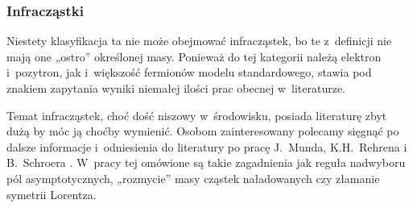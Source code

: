 \documentclass[10pt,t]{beamer}
\begin{document}
\begin{frame}
  \frametitle{Infracząstki}


  Niestety klasyfikacja ta \alert{nie} może obejmować infracząstek, bo
  te z~definicji nie mają one „ostro” określonej masy. Ponieważ do tej
  kategorii należą elektron i~pozytron, jak i~większość fermionów modelu
  standardowego, stawia pod znakiem zapytania wyniki niemałej ilości prac
  obecnej w~literaturze.

  Temat infracząstek, choć dość niszowy w~środowisku, posiada literaturę
  zbyt dużą by móc ją choćby wymienić. Osobom zainteresowany polecamy
  sięgnąć po dalsze informacje i~odniesienia do literatury po pracę
  J.~Munda, K.H.~Rehrena i B.~Schroera
  \parencite{Mund-Rehren-Schroer-Infraparticle-quantum-fiels-ETC-Pub-2022}.
  W~pracy tej omówione są takie zagadnienia jak reguła nadwyboru pól
  asymptotycznych, „rozmycie” masy cząstek naładowanych czy złamanie
  symetrii Lorentza.

\end{frame}













\end{document}
